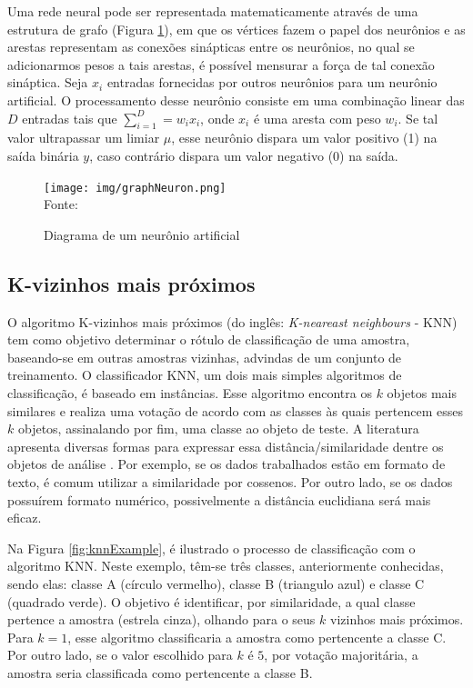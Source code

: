  Uma rede neural pode ser representada matematicamente através de uma estrutura de grafo (Figura \ref{fig:graphNeuron}), em que os vértices fazem o papel dos neurônios e as arestas representam as conexões sinápticas entre os neurônios, no qual se adicionarmos pesos a tais arestas, é possível mensurar a força de tal conexão sináptica. Seja $x_i$ entradas fornecidas por outros neurônios para um neurônio artificial. O processamento desse neurônio consiste em uma combinação linear das $D$ entradas tais que $\sum_{i=1}^{D} = w_i x_i$, onde $x_i$ é uma aresta com peso $w_i$. Se tal valor ultrapassar um limiar $\mu$, esse neurônio dispara um valor positivo (1) na saída binária $y$, caso contrário dispara um valor negativo (0) na saída. 

\begin{figure}[ht!]
\caption{Diagrama de um neurônio artificial}
\label{fig:graphNeuron}
\centering
\texttt{[image: img/graphNeuron.png]}
{\fontsize{11pt}{\baselineskip}\selectfont
\\Fonte: \cite{Rauber2005}
}
\end{figure}

\subsection{K-vizinhos mais próximos}
O algoritmo K-vizinhos mais próximos (do inglês: \textit{K-neareast neighbours} - KNN) tem como objetivo determinar o rótulo de classificação de uma amostra, baseando-se em outras amostras vizinhas, advindas de um conjunto de treinamento. O classificador KNN, um dois mais simples algoritmos de classificação, é baseado em
instâncias. Esse algoritmo encontra os $k$ objetos mais similares e realiza uma votação de acordo com as classes às quais pertencem esses $k$ objetos, assinalando por fim, uma classe ao objeto de teste. A literatura apresenta diversas formas para expressar essa distância/similaridade dentre os objetos de análise \citep{fukunaga1975knn, duda1973pattern}. Por exemplo, se os dados trabalhados estão em formato de texto, é comum utilizar a similaridade por cossenos. Por outro lado, se os dados possuírem formato numérico, possivelmente a distância euclidiana será mais eficaz.

Na Figura \ref{fig:knnExample}, é ilustrado o processo de classificação com o algoritmo KNN. Neste exemplo, têm-se três classes, anteriormente conhecidas, sendo elas: classe A (círculo vermelho), classe B (triangulo azul) e classe C (quadrado verde). O objetivo é identificar, por similaridade, a qual classe pertence a amostra (estrela cinza), olhando para o seus $k$ vizinhos mais próximos. Para $k = 1$, esse algoritmo classificaria a amostra como pertencente a classe C. Por outro lado, se o valor escolhido para $k$ é $5$, por votação majoritária, a amostra seria classificada como pertencente a classe B.

